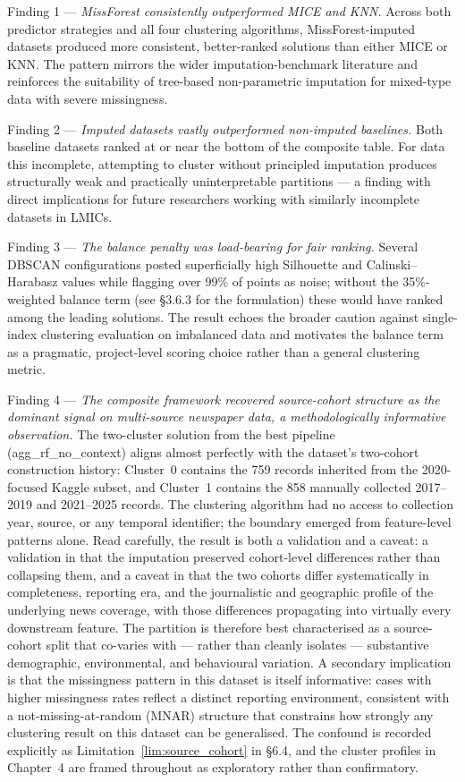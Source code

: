 Finding 1 --- \textit{MissForest consistently outperformed MICE and KNN.} Across both predictor strategies and all four clustering algorithms, MissForest-imputed datasets produced more consistent, better-ranked solutions than either MICE or KNN. The pattern mirrors the wider imputation-benchmark literature \cite{ref12,ref32,ref33} and reinforces the suitability of tree-based non-parametric imputation for mixed-type data with severe missingness.

Finding 2 --- \textit{Imputed datasets vastly outperformed non-imputed baselines.} Both baseline datasets ranked at or near the bottom of the composite table. For data this incomplete, attempting to cluster without principled imputation produces structurally weak and practically uninterpretable partitions --- a finding with direct implications for future researchers working with similarly incomplete datasets in LMICs.

Finding 3 --- \textit{The balance penalty was load-bearing for fair ranking.} Several DBSCAN configurations posted superficially high Silhouette and Calinski--Harabasz values while flagging over 99\% of points as noise; without the 35\%-weighted balance term (see \S3.6.3 for the formulation) these would have ranked among the leading solutions. The result echoes the broader caution against single-index clustering evaluation on imbalanced data \cite{ref54} and motivates the balance term as a pragmatic, project-level scoring choice rather than a general clustering metric.

Finding 4 --- \textit{The composite framework recovered source-cohort structure as the dominant signal on multi-source newspaper data, a methodologically informative observation.} The two-cluster solution from the best pipeline (agg\_rf\_no\_context) aligns almost perfectly with the dataset's two-cohort construction history: Cluster~0 contains the 759 records inherited from the 2020-focused Kaggle subset, and Cluster~1 contains the 858 manually collected 2017--2019 and 2021--2025 records. The clustering algorithm had no access to collection year, source, or any temporal identifier; the boundary emerged from feature-level patterns alone. Read carefully, the result is both a validation and a caveat: a validation in that the imputation preserved cohort-level differences rather than collapsing them, and a caveat in that the two cohorts differ systematically in completeness, reporting era, and the journalistic and geographic profile of the underlying news coverage, with those differences propagating into virtually every downstream feature. The partition is therefore best characterised as a source-cohort split that co-varies with --- rather than cleanly isolates --- substantive demographic, environmental, and behavioural variation. A secondary implication is that the missingness pattern in this dataset is itself informative: cases with higher missingness rates reflect a distinct reporting environment, consistent with a not-missing-at-random (MNAR) structure that constrains how strongly any clustering result on this dataset can be generalised. The confound is recorded explicitly as Limitation~\ref{lim:source_cohort} in \S6.4, and the cluster profiles in Chapter~4 are framed throughout as exploratory rather than confirmatory.

